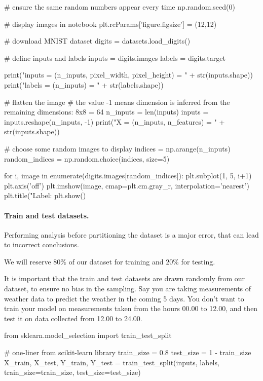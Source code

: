 \documentclass[%
oneside,                 %
final,                   %
10pt]{article}
\begin{document}
# ensure the same random numbers appear every time
np.random.seed(0)

# display images in notebook
plt.rcParams['figure.figsize'] = (12,12)


# download MNIST dataset
digits = datasets.load_digits()

# define inputs and labels
inputs = digits.images
labels = digits.target

print("inputs = (n_inputs, pixel_width, pixel_height) = " + str(inputs.shape))
print("labels = (n_inputs) = " + str(labels.shape))


# flatten the image
# the value -1 means dimension is inferred from the remaining dimensions: 8x8 = 64
n_inputs = len(inputs)
inputs = inputs.reshape(n_inputs, -1)
print("X = (n_inputs, n_features) = " + str(inputs.shape))


# choose some random images to display
indices = np.arange(n_inputs)
random_indices = np.random.choice(indices, size=5)

for i, image in enumerate(digits.images[random_indices]):
    plt.subplot(1, 5, i+1)
    plt.axis('off')
    plt.imshow(image, cmap=plt.cm.gray_r, interpolation='nearest')
    plt.title("Label: %
plt.show()
\epycod

\paragraph{Train and test datasets.}
Performing analysis before partitioning the dataset is a major error, that can lead to incorrect conclusions.  

We will reserve $80 \%$ of our dataset for training and $20 \%$ for testing.  

It is important that the train and test datasets are drawn randomly from our dataset, to ensure
no bias in the sampling.  
Say you are taking measurements of weather data to predict the weather in the coming 5 days.
You don't want to train your model on measurements taken from the hours 00.00 to 12.00, and then test it on data
collected from 12.00 to 24.00.


\bpycod
from sklearn.model_selection import train_test_split

# one-liner from scikit-learn library
train_size = 0.8
test_size = 1 - train_size
X_train, X_test, Y_train, Y_test = train_test_split(inputs, labels, train_size=train_size,
                                                    test_size=test_size)
\end{document}
